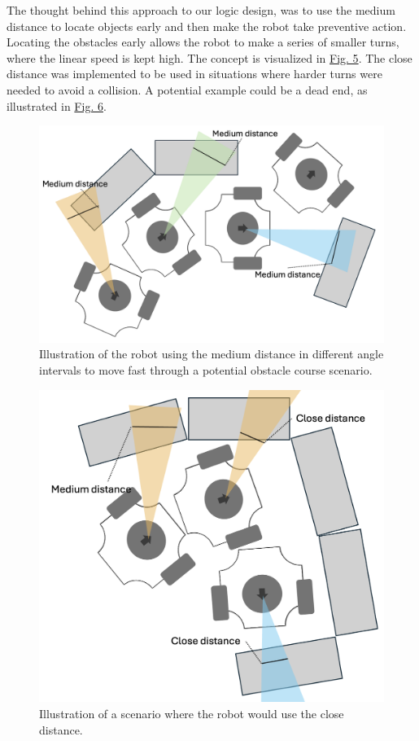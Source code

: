 \documentclass[conference]{IEEEtran}
\begin{document}
The thought behind this approach to our logic design, was to use the medium distance to locate objects early and then make the robot take preventive action.
Locating the obstacles early allows the robot to make a series of smaller turns, where the linear speed is kept high. The concept is visualized in \href{sec:medium aviodance}{Fig. 5}.
The close distance was implemented to be used in situations where harder turns were needed to avoid a collision. A potential example could be a dead end, as illustrated in \href{sec:close aviodance}{Fig. 6}.
\begin{figure}[htbp]
    \centerline{\includegraphics[width=0.9\columnwidth]{Pictures/Medium Distance Aviodance.png}}
    \caption{Illustration of the robot using the medium distance in different angle intervals to move fast through a potential obstacle course scenario.}
    \label{sec:medium aviodance}
    \end{figure}
\begin{figure}[htbp]
    \centerline{\includegraphics[width=0.9\columnwidth]{Pictures/Close Distance Avoidance.png}}
    \caption{Illustration of a scenario where the robot would use the close distance.}
    \label{sec:close aviodance}
    \end{figure}
\end{document}
